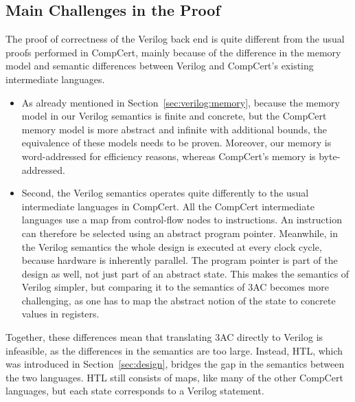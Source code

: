 \subsection{Main Challenges in the Proof}

The proof of correctness of the Verilog back end is quite different from the usual proofs performed in CompCert, mainly because of the difference in the memory model and semantic differences between Verilog and CompCert's existing intermediate languages.

\begin{itemize}
\item As already mentioned in Section~\ref{sec:verilog:memory}, because the memory model in our Verilog semantics is finite and concrete, but the CompCert memory model is more abstract and infinite with additional bounds, the equivalence of these models needs to be proven.  Moreover, our memory is word-addressed for efficiency reasons, whereas CompCert's memory is byte-addressed.

\item Second, the Verilog semantics operates quite differently to the usual intermediate languages in CompCert.  All the CompCert intermediate languages use a map from control-flow nodes to instructions.  An instruction can therefore be selected using an abstract program pointer. Meanwhile, in the Verilog semantics the whole design is executed at every clock cycle, because hardware is inherently parallel. The program pointer is part of the design as well, not just part of an abstract state. This makes the semantics of Verilog simpler, but comparing it to the semantics of 3AC becomes more challenging, as one has to map the abstract notion of the state to concrete values in registers.
\end{itemize}

Together, these differences mean that translating 3AC directly to Verilog is infeasible, as the differences in the semantics are too large.  Instead, HTL, which was introduced in Section~\ref{sec:design}, bridges the gap in the semantics between the two languages.  HTL still consists of maps, like many of the other CompCert languages, but each state corresponds to a Verilog statement.

